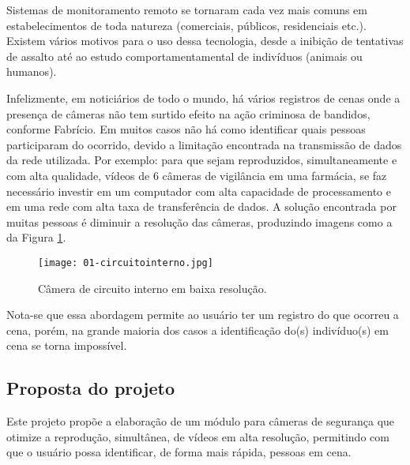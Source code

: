 \documentclass[a4paper,12pt]{article}
\begin{document}
\begin{flushleft}
	
\hspace{4ex}Sistemas de monitoramento remoto se tornaram cada vez mais comuns em estabelecimentos de toda natureza (comerciais, públicos, residenciais etc.). Existem vários motivos para o uso dessa tecnologia, desde a inibição de tentativas de assalto até ao estudo comportamentamental de indivíduos (animais ou humanos).


\hspace{4ex}Infelizmente, em noticiários de todo o mundo, há vários registros de cenas onde a presença de câmeras não tem surtido efeito na ação criminosa de bandidos, conforme Fabrício\cite{fab}. Em muitos casos não há como identificar quais pessoas participaram do ocorrido, devido a limitação encontrada na transmissão de dados da rede utilizada. Por exemplo: para que sejam reproduzidos, simultaneamente e com alta qualidade, vídeos de 6 câmeras de vigilância em uma farmácia, se faz necessário investir em um computador com alta capacidade de processamento e em uma rede com alta taxa de transferência de dados. A solução encontrada por muitas pessoas é diminuir a resolução das câmeras, produzindo imagens como a da Figura \ref{lowresolutioncamera}. 
\begin{figure}[h!]
\texttt{[image: 01-circuitointerno.jpg]}
\caption{Câmera de circuito interno em baixa resolução.}
\label{lowresolutioncamera}
\end{figure}

\hspace{4ex} Nota-se que essa abordagem permite ao usuário ter um registro do que ocorreu a cena, porém, na grande maioria dos casos a identificação do(s) indivíduo(s) em cena se torna impossível.

\end{flushleft}
\subsection{Proposta do projeto}
\hspace{4ex}Este projeto propõe a elaboração de um módulo para câmeras de segurança que otimize a reprodução, simultânea, de vídeos em alta resolução, permitindo com que o usuário possa identificar, de forma mais rápida, pessoas em cena.

\newpage


\thispagestyle{main}
\end{document}
